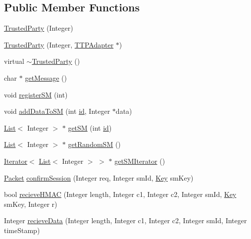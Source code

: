 \subsection*{Public Member Functions}
\begin{DoxyCompactItemize}
\item 
\hyperlink{classSMImp_1_1TrustedParty_aec9d85830faf563a55c67b637b38bc0a}{Trusted\+Party} (Integer)
\item 
\hyperlink{classSMImp_1_1TrustedParty_ad48b557601e6793a80b9b4b42d586da1}{Trusted\+Party} (Integer, \hyperlink{classTTPAdapter}{T\+T\+P\+Adapter} $\ast$)
\item 
virtual \hyperlink{classSMImp_1_1TrustedParty_a93dd8343a752486f8a47691b429ad6a3}{$\sim$\+Trusted\+Party} ()
\item 
char $\ast$ \hyperlink{classSMImp_1_1TrustedParty_ab15efea2439c964eec1f0cdae82843ac}{get\+Message} ()
\item 
void \hyperlink{classSMImp_1_1TrustedParty_adc01721f3200888877174376a5b2464f}{register\+SM} (int)
\item 
void \hyperlink{classSMImp_1_1TrustedParty_aa8343369b112c07a86ab42a9ee64228b}{add\+Data\+To\+SM} (int \hyperlink{classSMImp_1_1Requester_a16911083f2e3fc903ed3e6e7ca2a58b1}{id}, Integer $\ast$data)
\item 
\hyperlink{classList}{List}$<$ Integer $>$ $\ast$ \hyperlink{classSMImp_1_1TrustedParty_a979f9046e92d8be8fd97b1f3bc92dcd0}{get\+SM} (int \hyperlink{classSMImp_1_1Requester_a16911083f2e3fc903ed3e6e7ca2a58b1}{id})
\item 
\hyperlink{classList}{List}$<$ Integer $>$ $\ast$ \hyperlink{classSMImp_1_1TrustedParty_a8c0452d2d9842a1c24ebf6dffac9529a}{get\+Random\+SM} ()
\item 
\hyperlink{classIterator}{Iterator}$<$ \hyperlink{classList}{List}$<$ Integer $>$ $>$ $\ast$ \hyperlink{classSMImp_1_1TrustedParty_a01cbd1bd12aaca134b0730bd2a6eb933}{get\+S\+M\+Iterator} ()
\item 
\hyperlink{structSMImp_1_1Packet}{Packet} \hyperlink{classSMImp_1_1TrustedParty_a34334b73f543168b6270a8bb36de04c3}{confirm\+Session} (Integer req, Integer sm\+Id, \hyperlink{structSMImp_1_1Key}{Key} sm\+Key)
\item 
bool \hyperlink{classSMImp_1_1TrustedParty_a889787f394517703c1d9d2dfd9b9ff9b}{recieve\+H\+M\+AC} (Integer length, Integer c1, Integer c2, Integer sm\+Id, \hyperlink{structSMImp_1_1Key}{Key} sm\+Key, Integer r)
\item 
Integer \hyperlink{classSMImp_1_1TrustedParty_ab812aac2ce15865341874f1cd9550ba4}{recieve\+Data} (Integer length, Integer c1, Integer c2, Integer sm\+Id, Integer time\+Stamp)
\end{DoxyCompactItemize}
